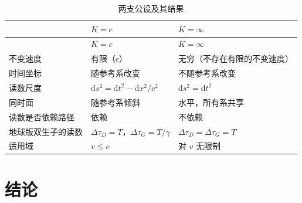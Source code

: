 \documentclass[
  chinese,
  a4paper,
  UTF8,
  12pt,
  oneside,
  openany]{ctexbook}
\theoremstyle{plain}
\theoremstyle{plain}
\theoremstyle{plain}
\theoremstyle{definition}
\theoremstyle{plain}
\theoremstyle{plain}
\theoremstyle{remark}
\begin{document}
\begin{longtable}[]{@{}
  >{\raggedright\arraybackslash}p{}
  >{\raggedright\arraybackslash}p{}
  >{\raggedright\arraybackslash}p{}@{}}
\caption{两支公设及其结果}\label{tbl-ta-conclusion}\tabularnewline
\toprule\noalign{}
\begin{minipage}[b]{\linewidth}\raggedright
\end{minipage} & \begin{minipage}[b]{\linewidth}\raggedright
\(K=c\)
\end{minipage} & \begin{minipage}[b]{\linewidth}\raggedright
\(K=\infty\)
\end{minipage} \\
\midrule\noalign{}
\endfirsthead
\toprule\noalign{}
\begin{minipage}[b]{\linewidth}\raggedright
\end{minipage} & \begin{minipage}[b]{\linewidth}\raggedright
\(K=c\)
\end{minipage} & \begin{minipage}[b]{\linewidth}\raggedright
\(K=\infty\)
\end{minipage} \\
\midrule\noalign{}
\endhead
\bottomrule\noalign{}
\endlastfoot
不变速度 & 有限（\(c\)） & 无穷（不存在有限的不变速度） \\
时间坐标 & 随参考系改变 & 不随参考系改变 \\
读数尺度 & \(\mathrm{d}s^{2}=\mathrm{d}t^{2}-\mathrm{d}x^{2}/c^{2}\) &
\(\mathrm{d}s^{2}=\mathrm{d}t^{2}\) \\
同时面 & 随参考系倾斜 & 水平，所有系共享 \\
读数是否依赖路径 & 依赖 & 不依赖 \\
地球版双生子的读数 & \(\Delta\tau_D=T\)，\(\Delta\tau_G=T/\gamma\) &
\(\Delta\tau_D=\Delta\tau_G=T\) \\
适用域 & \(v\le c\) & 对 \(v\) 无限制 \\
\end{longtable}

\section{结论}\label{sec-tc-conclusion}
\end{document}
